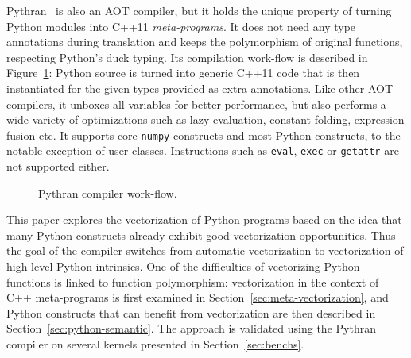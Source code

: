 \documentclass[10pt]{sigplanconf}
\begin{document}
Pythran~\cite{pythran2013, pyhpc2013} is also an AOT compiler, but it holds the
unique property of turning Python modules into C++11 \emph{meta-programs}. It
does not need any type annotations during translation and keeps the
polymorphism of original functions, respecting Python's duck typing. Its
compilation work-flow is described in Figure~\ref{fig:pythran-compiler}: Python
source is turned into generic C++11 code that is then instantiated for the
given types provided as extra annotations.  Like other AOT compilers, it
unboxes all variables for better performance, but also performs a wide variety
of optimizations such as lazy evaluation, constant folding, expression fusion
etc.  It supports core \texttt{numpy} constructs and most Python constructs, to
the notable exception of user classes. Instructions such as \texttt{eval},
\texttt{exec} or \texttt{getattr} are not supported either.

\begin{figure}

\centering
{}

\caption{Pythran compiler work-flow.}
\label{fig:pythran-compiler}
\end{figure}


This paper explores the vectorization of Python programs based on the idea that
many Python constructs already exhibit good vectorization opportunities. Thus
the goal of the compiler switches from automatic vectorization to vectorization
of high-level Python intrinsics. One of the difficulties of vectorizing Python
functions is linked to function polymorphism: vectorization in the context of
C++ meta-programs is first examined in Section~\ref{sec:meta-vectorization},
and Python constructs that can benefit from vectorization are then described in
Section~\ref{sec:python-semantic}. The approach is validated using the Pythran
compiler on several kernels presented in Section~\ref{sec:benchs}.
\end{document}
